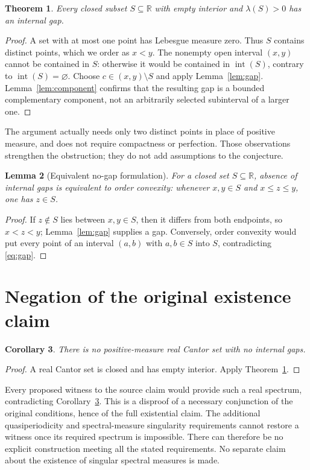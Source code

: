 \documentclass[11pt]{article}
\newtheorem{theorem}{Theorem}
\newtheorem{lemma}[theorem]{Lemma}
\newtheorem{corollary}[theorem]{Corollary}
\newcommand{\R}{\mathbb R}
\newcommand{\vol}{\lambda}
\newcommand{\Int}{\operatorname{int}}
\begin{document}
\begin{theorem}\label{thm:main}
Every closed subset $S\subseteq\R$ with empty interior and
$\vol(S)>0$ has an internal gap.
\end{theorem}
\begin{proof}
A set with at most one point has Lebesgue measure zero. Thus $S$ contains
distinct points, which we order as $x<y$. The nonempty open interval $(x,y)$
cannot be contained in $S$: otherwise it would be contained in $\Int(S)$,
contrary to $\Int(S)=\varnothing$. Choose $c\in(x,y)\setminus S$ and apply
Lemma~\ref{lem:gap}. Lemma~\ref{lem:component} confirms that the resulting
gap is a bounded complementary component, not an arbitrarily selected
subinterval of a larger one.
\end{proof}

The argument actually needs only two distinct points in place of positive
measure, and does not require compactness or perfection. Those observations
strengthen the obstruction; they do not add assumptions to the conjecture.

\begin{lemma}[Equivalent no-gap formulation]\label{lem:convex}
For a closed set $S\subseteq\R$, absence of internal gaps is equivalent to
order convexity: whenever $x,y\in S$ and $x\leq z\leq y$, one has $z\in S$.
\end{lemma}
\begin{proof}
If $z\notin S$ lies between $x,y\in S$, then it differs from both endpoints,
so $x<z<y$; Lemma~\ref{lem:gap} supplies a gap. Conversely, order convexity
would put every point of an interval $(a,b)$ with $a,b\in S$ into $S$,
contradicting \eqref{eq:gap}.
\end{proof}

\section{Negation of the original existence claim}

\begin{corollary}\label{cor:cantor}
There is no positive-measure real Cantor set with no internal gaps.
\end{corollary}
\begin{proof}
A real Cantor set is closed and has empty interior. Apply
Theorem~\ref{thm:main}.
\end{proof}

Every proposed witness to the source claim would provide such a real spectrum,
contradicting Corollary~\ref{cor:cantor}. This is a disproof of a necessary
conjunction of the original conditions, hence of the full existential claim.
The additional quasiperiodicity and spectral-measure singularity requirements
cannot restore a witness once its required spectrum is impossible. There can
therefore be no explicit construction meeting all the stated requirements.
No separate claim about the existence of singular spectral measures is made.
\end{document}
